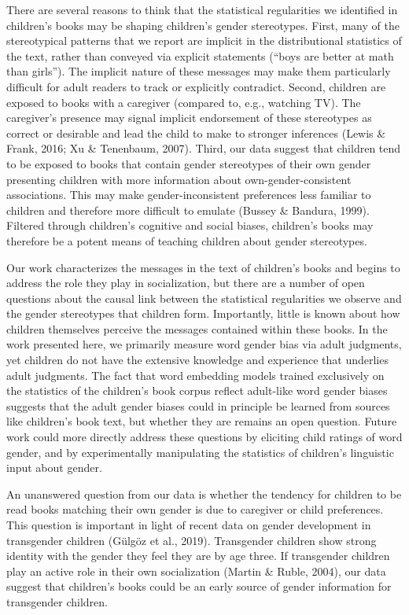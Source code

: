 \documentclass[
  english,
  ,man,floatsintext]{apa6}
\begin{document}
There are several reasons to think that the statistical regularities we identified in children's books may be shaping children's gender stereotypes. First, many of the stereotypical patterns that we report are implicit in the distributional statistics of the text, rather than conveyed via explicit statements (\enquote{boys are better at math than girls}). The implicit nature of these messages may make them particularly difficult for adult readers to track or explicitly contradict. Second, children are exposed to books with a caregiver (compared to, e.g., watching TV). The caregiver's presence may signal implicit endorsement of these stereotypes as correct or desirable and lead the child to make to stronger inferences (Lewis \& Frank, 2016; Xu \& Tenenbaum, 2007). Third, our data suggest that children tend to be exposed to books that contain gender stereotypes of their own gender presenting children with more information about own-gender-consistent associations. This may make gender-inconsistent preferences less familiar to children and therefore more difficult to emulate (Bussey \& Bandura, 1999). Filtered through children's cognitive and social biases, children's books may therefore be a potent means of teaching children about gender stereotypes.

Our work characterizes the messages in the text of children's books and begins to address the role they play in socialization, but there are a number of open questions about the causal link between the statistical regularities we observe and the gender stereotypes that children form. Importantly, little is known about how children themselves perceive the messages contained within these books. In the work presented here, we primarily measure word gender bias via adult judgments, yet children do not have the extensive knowledge and experience that underlies adult judgments. The fact that word embedding models trained exclusively on the statistics of the children's book corpus reflect adult-like word gender biases suggests that the adult gender biases could in principle be learned from sources like children's book text, but whether they are remains an open question. Future work could more directly address these questions by eliciting child ratings of word gender, and by experimentally manipulating the statistics of children's linguistic input about gender.

An unanswered question from our data is whether the tendency for children to be read books matching their own gender is due to caregiver or child preferences. This question is important in light of recent data on gender development in transgender children (Gülgöz et al., 2019). Transgender children show strong identity with the gender they feel they are by age three. If transgender children play an active role in their own socialization (Martin \& Ruble, 2004), our data suggest that children's books could be an early source of gender information for transgender children.
\end{document}
